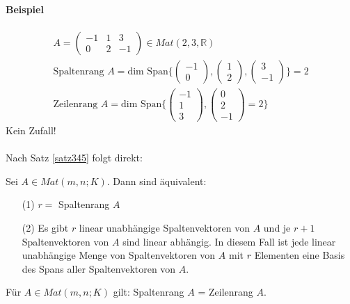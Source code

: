 \documentclass[11pt]{report}
\newcommand*\Zb[1] {\mathbb{#1}}
\begin{document}
\paragraph{Beispiel}
\begin{align}
 A = \begin{pmatrix} -1 & 1 & 3 \\ 0 & 2 & -1\end{pmatrix} \in Mat(2,3,\Zb{R}) \\
\text{Spaltenrang } A = \text{dim Span}\{\begin{pmatrix} -1 \\ 0 \end{pmatrix}, \begin{pmatrix} 1 \\ 2\end{pmatrix}, \begin{pmatrix} 3 \\ -1\end{pmatrix}\} = 2\\
\text{Zeilenrang } A = \text{dim Span}\{\begin{pmatrix} -1 \\ 1\\ 3 \end{pmatrix}, \begin{pmatrix} 0 \\ 2 \\-1 \end{pmatrix} = 2\}
\end{align}
Kein Zufall!\\\\
Nach Satz \ref{satz345} folgt direkt:
\begin{satz}
\label{satz521}
Sei $A \in Mat(m,n;K)$. Dann sind äquivalent:
\begin{itemize}
 \item[(1)] $r =$ Spaltenrang $A$
 \item[(2)] Es gibt $r$ linear unabhängige Spaltenvektoren von $A$ und je $r+1$ Spaltenvektoren von $A$ sind linear abhängig. In diesem Fall ist jede linear unabhängige Menge von Spaltenvektoren von $A$ mit $r$ Elementen eine Basis des Spans aller Spaltenvektoren von $A$.
\end{itemize}
\end{satz}

\begin{satz}
\label{satz522}
Für $A \in Mat(m,n;K)$ gilt: Spaltenrang $A$ = Zeilenrang $A$. \\
\end{satz}
\end{document}

